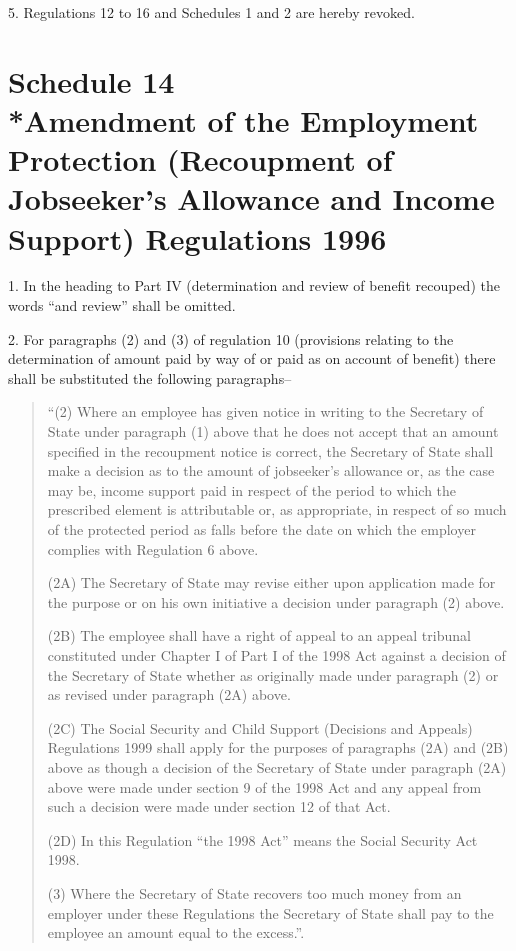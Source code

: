 \documentclass[12pt,a4paper]{article}
\begin{document}
\medskip

5.  Regulations 12 to 16 and Schedules 1 and 2 are hereby revoked.

\part[Schedule 14 --- Amendment of the Employment Protection (Recoupment of Jobseeker's Allowance and Income Support) Regulations 1996]{Schedule 14\\*Amendment of the Employment Protection (Recoupment of Jobseeker's Allowance and Income Support) Regulations 1996}

\renewcommand\parthead{--- Schedule 14}

1.  In the heading to Part IV (determination and review of benefit recouped) the words “and review” shall be omitted.

\medskip

2.  For paragraphs (2) and (3) of regulation 10 (provisions relating to the determination of amount paid by way of or paid as on account of benefit) there shall be substituted the following paragraphs–
\begin{quotation}
“(2) Where an employee has given notice in writing to the Secretary of State under paragraph (1) above that he does not accept that an amount specified in the recoupment notice is correct, the Secretary of State shall make a decision as to the amount of jobseeker’s allowance or, as the case may be, income support paid in respect of the period to which the prescribed element is attributable or, as appropriate, in respect of so much of the protected period as falls before the date on which the employer complies with Regulation 6 above.

(2A) The Secretary of State may revise either upon application made for the purpose or on his own initiative a decision under paragraph (2) above.

(2B) The employee shall have a right of appeal to an appeal tribunal constituted under Chapter I of Part I of the 1998 Act against a decision of the Secretary of State whether as originally made under paragraph (2) or as revised under paragraph (2A) above.

(2C) The Social Security and Child Support (Decisions and Appeals) Regulations 1999 shall apply for the purposes of paragraphs (2A) and (2B) above as though a decision of the Secretary of State under paragraph (2A) above were made under section 9 of the 1998 Act and any appeal from such a decision were made under section 12 of that Act.

(2D) In this Regulation “the 1998 Act” means the Social Security Act 1998.

(3) Where the Secretary of State recovers too much money from an employer under these Regulations the Secretary of State shall pay to the employee an amount equal to the excess.”.
\end{quotation}
\end{document}
